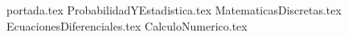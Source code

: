 
{portada.tex}
\newpage
\tableofcontents
\printindex
\newpage
{ProbabilidadYEstadistica.tex}
{MatematicasDiscretas.tex}
{EcuacionesDiferenciales.tex}
{CalculoNumerico.tex}

